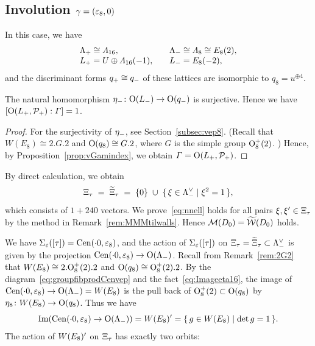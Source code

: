 \documentclass{amsart} %
\begin{document}
\subsection{Involution $\gamma=(\varepsilon_8, 0)$}\label{subsec:walls8}
%
In this case, we have
\[
\begin{array}{ll}
\Lambda_{+}\cong \varLambda_{16}, \quad &\Lambda_{-}\cong \varLambda_{8}\cong E_8(2),\\
L_{+}= U\oplus \varLambda_{16}(-1), \quad &L_{-}= E_8(-2),
\end{array}
\]
%
and the discriminant forms $q_{+}\cong q_{-}$ of these lattices are 
isomorphic to $q_8=u^{\oplus 4}$.
%
\begin{proposition}\label{prop:indexvep8}
The natural homomorphism ${\eta}_{-}\colon \mathord{\mathrm{O}}(L_{-})\to \mathord{\mathrm{O}}(q_{-})$ is surjective.
Hence we have $[\mathord{\mathrm{O}}(L_{+}, \mathord{\mathcal{P}}_{+}): \varGamma]=1$.
\end{proposition}
%
\begin{proof}
For the surjectivity of ${\eta}_{-}$, see Section~\ref{subsec:vep8}.
(Recall that $W(E_8)\cong2.G.2$ and $\mathord{\mathrm{O}}(q_8)\cong G.2$, where $G$ is the simple group $\mathord{\mathrm{O}}^+_8(2)$. )
Hence, by Proposition~\ref{prop:vGamindex}, we obtain $\varGamma=\mathord{\mathrm{O}}(L_{+}, \mathord{\mathcal{P}}_{+})$.
\end{proof}
%
By direct calculation, we obtain 
\[
\Xi_{\tau}\;=\;\widetilde{\Xi}_{\tau} \; =\; \{0\}\;\cup\;\{\,{\xi\in \Lambda_{-}^{\vee}}\mid {\xi^2=1} \,\},
\]
which consists of $1+240$ vectors.
We prove~\eqref{eq:nnell} holds for all pairs $\xi, \xi^{\prime}\in \Xi_{\tau}$
by the method in Remark~\ref{rem:MMMtilwalls}.
Hence 
$\mathord{\mathcal{M}}(D_0)=\widetilde{\mathord{\mathcal{W}}}(D_0)$ holds.
%
%
%
\par
%
We have $\Sigma_{\varepsilon}([\tau])=\mathrm{Cen}(\cdot 0, \varepsilon_{8})$,
and the action of $\Sigma_{\varepsilon}([\tau])$ on $\Xi_{\tau}=\widetilde{\Xi}_{\tau}\subset \Lambda_{-}^{\vee}$
is given by the projection 
$\mathrm{Cen}(\cdot 0, \varepsilon_{8})\to \mathord{\mathrm{O}}(\Lambda_{-})$.
Recall from Remark~\ref{rem:2G2} that $W(E_8)\cong 2.\mathord{\mathrm{O}}^{+}_8(2).2$ and $ \mathord{\mathrm{O}}(q_8)\cong \mathord{\mathrm{O}}^{+}_8(2).2$.
By the diagram~\eqref{eq:groupfibprodCenvep} and 
the fact~\eqref{eq:Imageeta16}, 
the image of $\mathrm{Cen}(\cdot 0, \varepsilon_{8})\to \mathord{\mathrm{O}}(\Lambda_{-})=W(E_8)$ is 
the pull back of $\mathord{\mathrm{O}}^{+}_8(2)\subset \mathord{\mathrm{O}}(q_8)$ by 
$\eta_8\colon W(E_8)\to \mathord{\mathrm{O}}(q_8)$.
Thus we have 
\[
\operatorname{Im}(\mathrm{Cen}(\cdot 0, \varepsilon_{8})\to \mathord{\mathrm{O}}(\Lambda_{-}) )=W(E_8)^{\prime}=\{\,{g\in W(E_8)}\mid {\det g=1} \,\}.
\]
The action of $W(E_8)^{\prime}$ on $\Xi_{\tau}$ has exactly two orbits:
\end{document}
